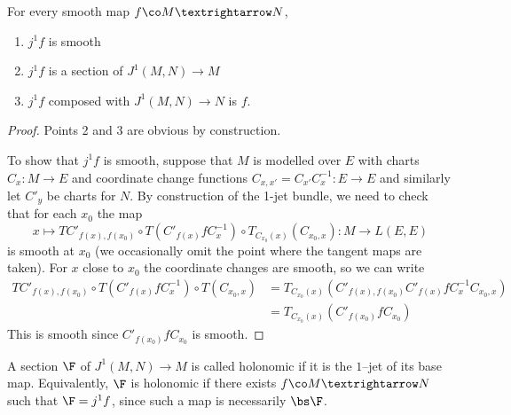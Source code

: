\begin{lemma}
\label{lem:one_jet_extension_prop}
\leanok
{}
For every smooth map $f \co M → N$,
\begin{enumerate}
  \item
    \label{lem:one_jet_smooth}
    $j^1f$ is smooth
  \item
    \label{lem:one_jet_section}
    $j^1f$ is a section of $J^1(M, N) → M$
  \item
    \label{lem:one_jet_zero_jet}
    $j^1f$ composed with $J^1(M, N) → N$ is $f$.
\end{enumerate}
\end{lemma}

\begin{proof}
  \leanok
  Points 2 and 3 are obvious by construction.

  To show that $j^1f$ is smooth, suppose that $M$ is modelled over $E$ with charts
  $C_x : M \to E$ and coordinate change functions
  $C_{x,x'}=C_{x'}C_x^{-1} : E \to E$ and similarly let $C'_y$ be charts for $N$.
  By construction of the 1-jet bundle, we need to check that for each $x_0$ the map
  $$x\mapsto TC'_{f(x),f(x_0)}\circ T(C'_{f(x)}fC_x^{-1})\circ
    T_{C_{x_0}(x)}(C_{x_0,x}): M \to L(E,E)$$
  is smooth at $x_0$ (we occasionally omit the point where the tangent maps are taken).
  For $x$ close to $x_0$ the coordinate changes are smooth, so we can write
  \begin{align*}
  TC'_{f(x),f(x_0)}\circ T(C'_{f(x)}fC_x^{-1})\circ T(C_{x_0,x})
  &= T_{C_{x_0}(x)}(C'_{f(x),f(x_0)}C'_{f(x)}fC_x^{-1}C_{x_0,x})\\
  &= T_{C_{x_0}(x)}(C'_{f(x_0)}fC_{x_0})
  \end{align*}
  This is smooth since $C'_{f(x_0)}fC_{x_0}$ is smooth.
\end{proof}

\begin{definition}
\label{def:holonomic_section}
\leanok
{}
A section $\F$ of $J^1(M, N) → M$ is called holonomic if it is the
$1$--jet of its base map.
Equivalently, $\F$ is holonomic if there exists
$f \co M → N$ such that $\F = j^1f$, since such a map is
necessarily $\bs \F$.
\end{definition}

